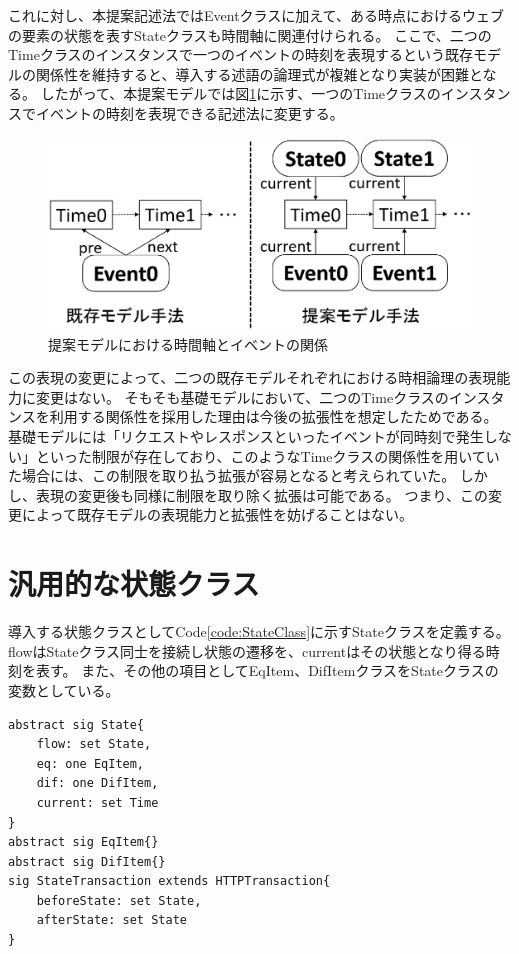 \documentclass[12pt,a4paper]{jbook}
\begin{document}
これに対し、本提案記述法ではEventクラスに加えて、ある時点におけるウェブの要素の状態を表すStateクラスも時間軸に関連付けられる。
ここで、二つのTimeクラスのインスタンスで一つのイベントの時刻を表現するという既存モデルの関係性を維持すると、導入する述語の論理式が複雑となり実装が困難となる。
したがって、本提案モデルでは図\ref{fig:ProposedModel-TimeClass}に示す、一つのTimeクラスのインスタンスでイベントの時刻を表現できる記述法に変更する。

\begin{figure}[htb]
\centering
\includegraphics[width=450pt]{./fig/ProposedModel-TimeClass.eps}
\caption{提案モデルにおける時間軸とイベントの関係}
\label{fig:ProposedModel-TimeClass}
\end{figure}

この表現の変更によって、二つの既存モデルそれぞれにおける時相論理の表現能力に変更はない。
そもそも基礎モデルにおいて、二つのTimeクラスのインスタンスを利用する関係性を採用した理由は今後の拡張性を想定したためである。
基礎モデルには「リクエストやレスポンスといったイベントが同時刻で発生しない」といった制限が存在しており、このようなTimeクラスの関係性を用いていた場合には、この制限を取り払う拡張が容易となると考えられていた。
しかし、表現の変更後も同様に制限を取り除く拡張は可能である。
つまり、この変更によって既存モデルの表現能力と拡張性を妨げることはない。

\section{汎用的な状態クラス}
\label{sec:state-class}
導入する状態クラスとしてCode\ref{code:StateClass}に示すStateクラスを定義する。
flowはStateクラス同士を接続し状態の遷移を、currentはその状態となり得る時刻を表す。
また、その他の項目としてEqItem、DifItemクラスをStateクラスの変数としている。
\begin{lstlisting}[caption=Stateクラス, label=code:StateClass]
abstract sig State{
	flow: set State,
	eq: one EqItem,
	dif: one DifItem,
	current: set Time
}
abstract sig EqItem{}
abstract sig DifItem{}
sig StateTransaction extends HTTPTransaction{
	beforeState: set State,
	afterState: set State
}
\end{lstlisting}
\end{document}
